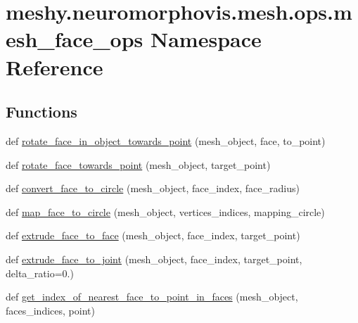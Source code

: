 \hypertarget{namespacemeshy_1_1neuromorphovis_1_1mesh_1_1ops_1_1mesh__face__ops}{}\section{meshy.\+neuromorphovis.\+mesh.\+ops.\+mesh\+\_\+face\+\_\+ops Namespace Reference}
\label{namespacemeshy_1_1neuromorphovis_1_1mesh_1_1ops_1_1mesh__face__ops}
\subsection*{Functions}
\begin{DoxyCompactItemize}
\item 
def \hyperlink{namespacemeshy_1_1neuromorphovis_1_1mesh_1_1ops_1_1mesh__face__ops_ac5c90d2baef067b71c3347002e20c8c5}{rotate\+\_\+face\+\_\+in\+\_\+object\+\_\+towards\+\_\+point} (mesh\+\_\+object, face, to\+\_\+point)
\item 
def \hyperlink{namespacemeshy_1_1neuromorphovis_1_1mesh_1_1ops_1_1mesh__face__ops_acb06525aa97ba478f3be98b140aa75dc}{rotate\+\_\+face\+\_\+towards\+\_\+point} (mesh\+\_\+object, target\+\_\+point)
\item 
def \hyperlink{namespacemeshy_1_1neuromorphovis_1_1mesh_1_1ops_1_1mesh__face__ops_a32c3e6f234570fea2cd52ad46dd46411}{convert\+\_\+face\+\_\+to\+\_\+circle} (mesh\+\_\+object, face\+\_\+index, face\+\_\+radius)
\item 
def \hyperlink{namespacemeshy_1_1neuromorphovis_1_1mesh_1_1ops_1_1mesh__face__ops_a55210c04dd065fca375f8d804d2cb4ef}{map\+\_\+face\+\_\+to\+\_\+circle} (mesh\+\_\+object, vertices\+\_\+indices, mapping\+\_\+circle)
\item 
def \hyperlink{namespacemeshy_1_1neuromorphovis_1_1mesh_1_1ops_1_1mesh__face__ops_a5cfb06002c2830c640cebb368c86e371}{extrude\+\_\+face\+\_\+to\+\_\+face} (mesh\+\_\+object, face\+\_\+index, target\+\_\+point)
\item 
def \hyperlink{namespacemeshy_1_1neuromorphovis_1_1mesh_1_1ops_1_1mesh__face__ops_a78c69d1bfa16f22380191227d0e7f70c}{extrude\+\_\+face\+\_\+to\+\_\+joint} (mesh\+\_\+object, face\+\_\+index, target\+\_\+point, delta\+\_\+ratio=0.)
\item 
def \hyperlink{namespacemeshy_1_1neuromorphovis_1_1mesh_1_1ops_1_1mesh__face__ops_a800e3217a8f34409cc6e862c9d5712af}{get\+\_\+index\+\_\+of\+\_\+nearest\+\_\+face\+\_\+to\+\_\+point\+\_\+in\+\_\+faces} (mesh\+\_\+object, faces\+\_\+indices, point)

\end{DoxyCompactItemize}
